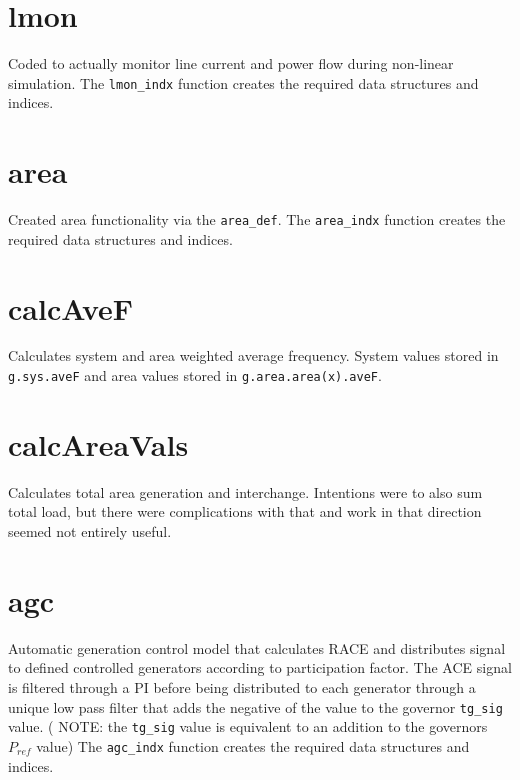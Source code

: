 \section{lmon}  
Coded to actually monitor line current and power flow during non-linear simulation.
The \verb|lmon_indx| function creates the required data structures and indices.
\section{area}  
Created area functionality via the \verb|area_def|.
The \verb|area_indx| function creates the required data structures and indices.

\section{calcAveF}  
Calculates system and area weighted average frequency.
System values stored in \verb|g.sys.aveF| and area values stored in \verb|g.area.area(x).aveF|.

\section{calcAreaVals}  
Calculates total area generation and interchange.
Intentions were to also sum total load, but there were complications with that and work in that direction seemed not entirely useful.

\section{agc}  
Automatic generation control model that calculates RACE and distributes signal to defined controlled generators according to participation factor.
The ACE signal is filtered through a PI before being distributed to each generator through a unique low pass filter that adds the negative of the value to the governor \verb|tg_sig| value.
( NOTE: the \verb|tg_sig| value is equivalent to an addition to the governors $P_{ref}$ value)
The \verb|agc_indx| function creates the required data structures and indices.

